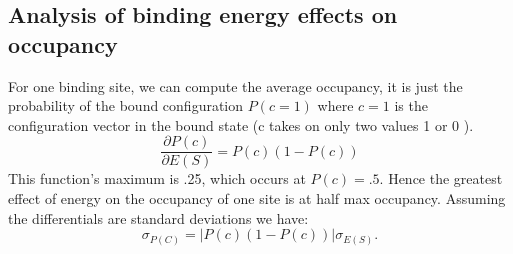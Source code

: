 \subsection*{Analysis of binding energy effects on occupancy}
For one binding site, we can compute the average occupancy, it is just the probability of the bound configuration $P(c=1)$ where $c=1$ is the configuration vector in the bound state (c takes on only two values 1 or 0 ).
\begin{equation}
\frac{\partial{P(c)}}{\partial{E(S)}} =  P(c)(1-P(c))
\end{equation}
This function's maximum is .25, which occurs at $P(c)=.5$.  Hence the greatest effect of energy on the occupancy of one site is at half max occupancy. 
Assuming the differentials are standard deviations we have:
\begin{equation}
 \sigma_{P(C)}=|P(c)(1-P(c))| \sigma_{E(S)}.
  \end{equation}  

